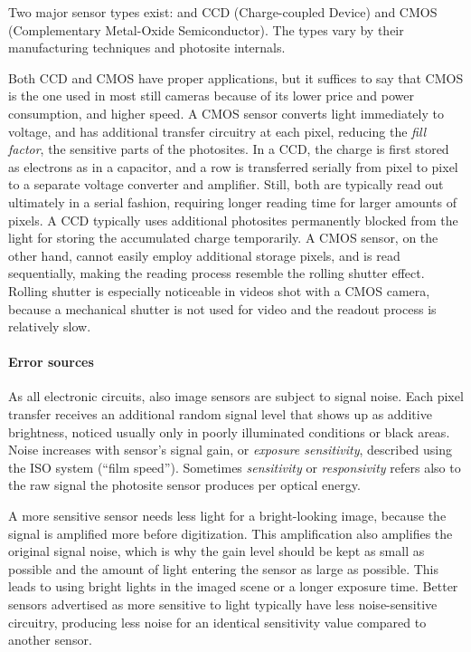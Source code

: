 Two major sensor types exist: and CCD (Charge-coupled Device) and CMOS (Complementary Metal-Oxide Semiconductor).
The types vary by their manufacturing techniques and photosite internals. \cite{taylor1998ccd,el2005cmos}

Both CCD and CMOS have proper applications, but it suffices to say that CMOS is the one used in most still cameras because of its lower price and power consumption, and higher speed.
A CMOS sensor converts light immediately to voltage, and has additional transfer circuitry at each pixel, reducing the \emph{fill factor}, the sensitive parts of the photosites.
In a CCD, the charge is first stored as electrons as in a capacitor, and a row is transferred serially from pixel to pixel to a separate voltage converter and amplifier.
Still, both are typically read out ultimately in a serial fashion, requiring longer reading time for larger amounts of pixels.
A CCD typically uses additional photosites permanently blocked from the light for storing the accumulated charge temporarily.
A CMOS sensor, on the other hand, cannot easily employ additional storage pixels, and is read sequentially, making the reading process resemble the rolling shutter effect.
Rolling shutter is especially noticeable in videos shot with a CMOS camera, because a mechanical shutter is not used for video and the readout process is relatively slow.
\cite{taylor1998ccd,caspeelectronic,litwiller2001ccd}

\paragraph{Error sources}
As all electronic circuits, also image sensors are subject to signal noise.
Each pixel transfer receives an additional random signal level that shows up as additive brightness, noticed usually only in poorly illuminated conditions or black areas.
Noise increases with sensor's signal gain, or \emph{exposure sensitivity}, described using the ISO system (``film speed'').
Sometimes \emph{sensitivity} or \emph{responsivity} refers also to the raw signal the photosite sensor produces per optical energy. \cite{litwiller2001ccd}

A more sensitive sensor needs less light for a bright-looking image, because the signal is amplified more before digitization.
This amplification also amplifies the original signal noise, which is why the gain level should be kept as small as possible and the amount of light entering the sensor as large as possible.
This leads to using bright lights in the imaged scene or a longer exposure time.
Better sensors advertised as more sensitive to light typically have less noise-sensitive circuitry, producing less noise for an identical sensitivity value compared to another sensor.
\cite{el2005cmos}

